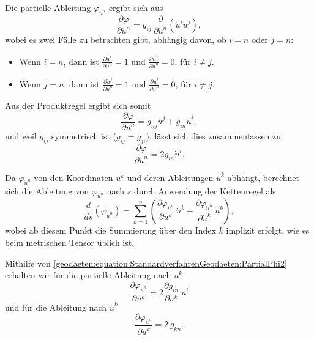 Die partielle Ableitung $\varphi_{\dot{u}^n}$ ergibt sich aus
\begin{equation}
	\frac{\partial \varphi}{\partial \dot{u}^n} = g_{ij} \, \frac{\partial}{\partial \dot{u}^n} \left( \dot{u}^i \dot{u}^j \right),
\end{equation}
wobei es zwei Fälle zu betrachten gibt, abhängig davon, ob $i = n$ oder $j = n$:
\begin{itemize}
	\item Wenn $i = n$, dann ist $\frac{\partial \dot{u}^i}{\partial \dot{u}^n} = 1$ und $\frac{\partial \dot{u}^j}{\partial \dot{u}^n} = 0$, für $i \neq j$.
	\item Wenn $j = n$, dann ist $\frac{\partial \dot{u}^j}{\partial \dot{u}^n} = 1$ und $\frac{\partial \dot{u}^i}{\partial \dot{u}^n} = 0$, für $i \neq j$.
\end{itemize}
Aus der Produktregel ergibt sich somit
\begin{equation}
	\frac{\partial \varphi}{\partial \dot{u}^n} = g_{nj} \dot{u}^j + g_{in} \dot{u}^i,
\end{equation}
und weil $g_{ij}$ symmetrisch ist ($g_{ij} = g_{ji}$), lässt sich dies zusammenfassen zu
\begin{equation}
	\frac{\partial \varphi}{\partial \dot{u}^n} = 2g_{in} \dot{u}^i.
	\label{geodaeten:equation:StandardverfahrenGeodaeten:PartialPhi2}
\end{equation}

Da $\varphi_{\dot{u}^n}$ von den Koordinaten $u^k$ und deren Ableitungen $\dot{u}^k$ abhängt, berechnet sich die Ableitung von $\varphi_{\dot{u}^n}$ nach $s$ durch Anwendung der Kettenregel als
\begin{equation}
	\frac{d}{ds} \left( \varphi_{\dot{u}^n} \right) = \sum_{k = 1}^n \left( \frac{\partial \varphi_{\dot{u}^n}}{\partial u^k} \, \dot{u}^k + \frac{\partial \varphi_{\dot{u}^n}}{\partial \dot{u}^k} \, \ddot{u}^k \right),
	\label{geodaeten:equation:StandardverfahrenGeodaeten:Ableitung1s}
\end{equation}
wobei ab diesem Punkt die Summierung über den Index $k$ implizit erfolgt, wie es beim metrischen Tensor üblich ist.

Mithilfe von \eqref{geodaeten:equation:StandardverfahrenGeodaeten:PartialPhi2} erhalten wir für die partielle Ableitung nach $u^k$  
\begin{equation}
	\frac{\partial \varphi_{\dot{u}^n}}{\partial u^k} = 
	2 \frac{\partial g_{in}}{\partial u^k} \ \dot{u}^i
\end{equation}
und für die Ableitung nach $\dot{u}^k$
\begin{equation}
	\frac{\partial \varphi_{\dot{u}^n}}{\partial \dot{u}^k} = 
	2 \, g_{kn}.
\end{equation}

